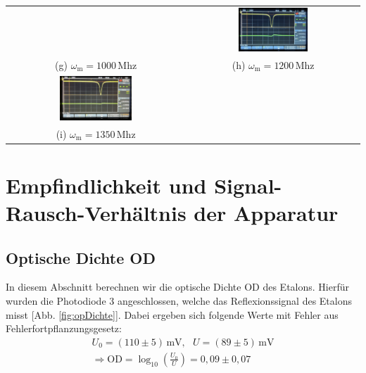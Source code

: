 \begin{center}
\begin{tabular}{c c}
        & \includegraphics[width=0.42\textwidth]{Bilder/Modulationsindex/mindex_1200.jpg} \\
        (g) $\omega_\mathrm{m} = 1000$\,Mhz & (h) $\omega_\mathrm{m} = 1200$\,Mhz \\[0,3cm]
        \includegraphics[width=0.42\textwidth]{Bilder/Modulationsindex/mindex_1350.jpg} & \\
        (i) $\omega_\mathrm{m} = 1350$\,Mhz & \\
    \end{tabular}
    \label{fig:mindex2}
\end{center}

\newpage

\section{Empfindlichkeit und Signal-Rausch-Verhältnis der Apparatur}
\label{sec:signalRausch}

\subsection{Optische Dichte OD}
\label{sub:opDichte}

In diesem Abschnitt berechnen wir die optische Dichte OD des Etalons. Hierfür wurden die Photodiode 3 angeschlossen, welche das Reflexionssignal des Etalons misst [Abb. \ref{fig:opDichte}]. Dabei ergeben sich folgende Werte mit Fehler aus Fehlerfortpflanzungsgesetz:
\begin{gather}
    U_0 = (110 \pm 5)\,\mathrm{mV}, ~~~U = (89 \pm 5)\,\mathrm{mV}\\[0,5cm]
    \Rightarrow \boxed{\mathrm{OD} = \log_{10}\left(\frac{U_0}{U}\right) = 0,09 \pm 0,07}
\end{gather} 

